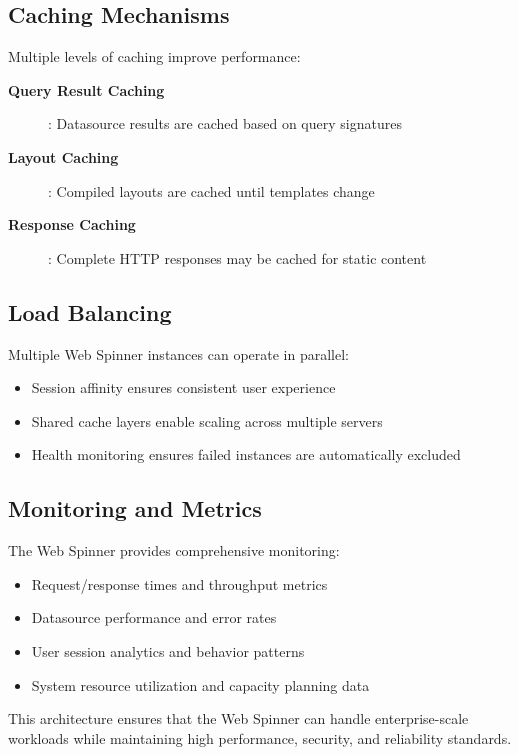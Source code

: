 \subsection{Caching Mechanisms}

Multiple levels of caching improve performance:

\begin{description}
	\item[\textbf{Query Result Caching}]: Datasource results are cached based on query signatures
	\item[\textbf{Layout Caching}]: Compiled layouts are cached until templates change
	\item[\textbf{Response Caching}]: Complete HTTP responses may be cached for static content
\end{description}

\subsection{Load Balancing}

Multiple Web Spinner instances can operate in parallel:
\begin{itemize}
	\item Session affinity ensures consistent user experience
	\item Shared cache layers enable scaling across multiple servers
	\item Health monitoring ensures failed instances are automatically excluded
\end{itemize}

\subsection{Monitoring and Metrics}

The Web Spinner provides comprehensive monitoring:
\begin{itemize}
	\item Request/response times and throughput metrics
	\item Datasource performance and error rates
	\item User session analytics and behavior patterns
	\item System resource utilization and capacity planning data
\end{itemize}

This architecture ensures that the Web Spinner can handle enterprise-scale workloads while maintaining high performance, security, and reliability standards.

